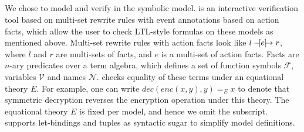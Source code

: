 \subsection{\mTamarin{}}
\label{sec:tamarin}
 
We chose \mTamarin{} to model and verify \mEdhoc{} in the symbolic model.
%
\mTamarin{} is an interactive verification tool based on multi-set rewrite rules
with event annotations based on action facts, which allow the user to check
 LTL-style formulas on these models as mentioned above.
%
Multi-set rewrite rules with action facts look like $ l \ifarrow[e] r $,
where $l$ and $r$ are multi-sets of facts, and $e$ is a multi-set of action facts.
Facts are $n$-ary predicates over a term algebra, which defines a set of function
symbols $\mathcal F$, variables $\mathcal V$ and names $\mathcal N$. \mTamarin{}
checks equality of these terms under an equational theory $E$. For example,
one can write $ dec(enc(x,y),y) =_E x $
to denote that symmetric decryption reverses the encryption operation under this theory.
The equational theory $E$ is fixed per model, and hence we omit the subscript.
\mTamarin{} supports let-bindings and tuples as syntactic sugar to simplify model
definitions. \\

%

